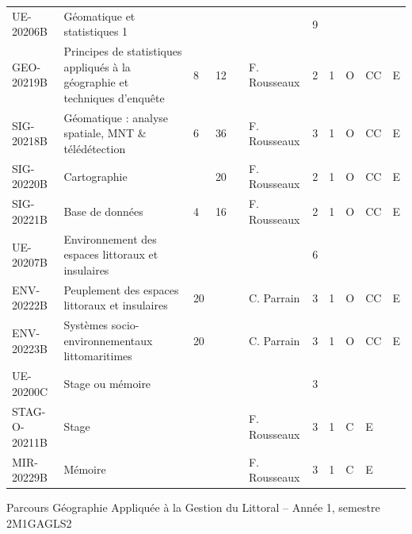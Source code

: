 \documentclass[a4paper,11pt]{article}
\begin{document}
{{\begin{tabular}{lllllllllll}
\rowcolor[HTML]{EFEFEF} 
UE-20206B                          & Géomatique et statistiques 1                                                &    &    &    &                                    & 9    &      &             &           &           \\
GEO-20219B                         & Principes de statistiques appliqués à la géographie et techniques d'enquête & 8  & 12 &    & F. Rousseaux                       & 2    & 1    & O           & CC        & E         \\
SIG-20218B                         & Géomatique : analyse spatiale, MNT \& télédétection                         & 6  & 36 &    & F. Rousseaux                       & 3    & 1    & O           & CC        & E         \\
SIG-20220B                         & Cartographie                                                                &    & 20 &    & F. Rousseaux                       & 2    & 1    & O           & CC        & E         \\
SIG-20221B                         & Base de données                                                             & 4  & 16 &    & F. Rousseaux                       & 2    & 1    & O           & CC        & E         \\
\rowcolor[HTML]{EFEFEF} 
UE-20207B                          & Environnement des espaces littoraux et insulaires                           &    &    &    &                                    & 6    &      &             &           &           \\
ENV-20222B                         & Peuplement des espaces littoraux et insulaires                              & 20 &    &    & C. Parrain                         & 3    & 1    & O           & CC        & E         \\
ENV-20223B                         & Systèmes socio-environnementaux littomaritimes                              & 20 &    &    & C. Parrain                         & 3    & 1    & O           & CC        & E         \\
\rowcolor[HTML]{EFEFEF} 
UE-20200C                          & Stage ou mémoire                                                            &    &    &    &                                    & 3    &      &             &           &           \\
STAG-O-20211B                      & Stage                                                                       &    &    &    & F. Rousseaux                       & 3    & 1    & C           & E         &           \\
MIR-20229B                         & Mémoire                                                                     &    &    &    & F. Rousseaux                       & 3    & 1    & C           & E         &          
\end{tabular}}
}{Parcours Géographie Appliquée à la Gestion du Littoral -- Année 1, semestre 2}{M1GAGLS2}
\end{document}

